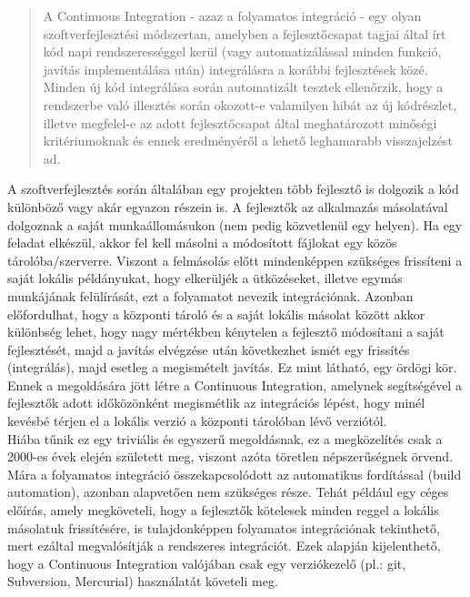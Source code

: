 \begin{quotation}
A Continuous Integration - azaz a folyamatos integráció - egy olyan szoftverfejlesztési módszertan, amelyben a fejlesztőcsapat tagjai által írt kód napi rendszerességgel kerül (vagy automatizálással minden funkció, javítás implementálása után) integrálásra a korábbi fejlesztések közé. Minden új kód integrálása során automatizált tesztek ellenőrzik, hogy a rendszerbe való illesztés során okozott-e valamilyen hibát az új kódrészlet, illetve megfelel-e az adott fejlesztőcsapat által meghatározott minőségi kritériumoknak és ennek eredményéről a lehető leghamarabb visszajelzést ad. \cite{martin_fowler_cont_int}
\end{quotation} 

A szoftverfejlesztés során általában egy projekten több fejlesztő is dolgozik a kód különböző vagy akár egyazon részein is. A fejlesztők az alkalmazás másolatával dolgoznak a saját munkaállomásukon (nem pedig közvetlenül egy helyen). Ha egy feladat elkészül, akkor fel kell másolni a módosított fájlokat egy közös tárolóba/szerverre. Viszont a felmásolás előtt mindenképpen szükséges frissíteni a saját lokális példányukat, hogy elkerüljék a ütközéseket, illetve egymás munkájának felülírását, ezt a folyamatot nevezik integrációnak. Azonban előfordulhat, hogy a központi tároló és a saját lokális másolat között akkor különbség lehet, hogy nagy mértékben kénytelen a fejlesztő módosítani a saját fejlesztését, majd a javítás elvégzése után következhet ismét egy frissítés (integrálás), majd esetleg a megismételt javítás. Ez mint látható, egy ördögi kör. Ennek a megoldására jött létre a Continuous Integration, amelynek segítségével a fejlesztők adott időközönként megismétlik az integrációs lépést, hogy minél kevésbé térjen el a lokális verzió a központi tárolóban lévő verziótól.
\hfill\\
Hiába tűnik ez egy triviális és egyszerű megoldásnak, ez a megközelítés csak a 2000-es évek elején született meg, viszont azóta töretlen népszerűségnek örvend. Mára a folyamatos integráció összekapcsolódott az automatikus fordítással (build automation), azonban alapvetően nem szükséges része. Tehát például egy céges előírás, amely megköveteli, hogy a fejlesztők kötelesek minden reggel a lokális másolatuk frissítésére, is tulajdonképpen folyamatos integrációnak tekinthető, mert ezáltal megvalósítják a rendszeres integrációt. Ezek alapján kijelenthető, hogy a Continuous Integration valójában csak egy verziókezelő (pl.: git, Subversion, Mercurial) használatát követeli meg.
